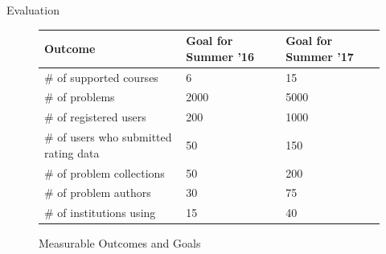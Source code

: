 \documentclass[11pt]{article}
\begin{document}
\begin{section}{Evaluation}
\begin{figure}
\begin{center}
\begin{tabular}{|l|l|l|}
  \hline
  \textbf{Outcome} & \textbf{Goal for Summer '16} & \textbf{Goal for
  Summer '17} \\
  \hline
  \hline
  \# of supported courses & 6 & 15 \\
  \hline
  \# of problems & 2000 & 5000 \\
  \hline
  \# of registered users & 200 & 1000 \\
  \hline
  \# of users who submitted rating data & 50 & 150 \\
  \hline
  \# of problem collections & 50 & 200 \\
  \hline
  \# of problem authors & 30 & 75 \\
  \hline
  \# of institutions using & 15 & 40 \\
  \hline
\end{tabular}
\caption{Measurable Outcomes and Goals}
\label{outcomes}
\end{center}
\end{figure}


\end{section}
\end{document}
